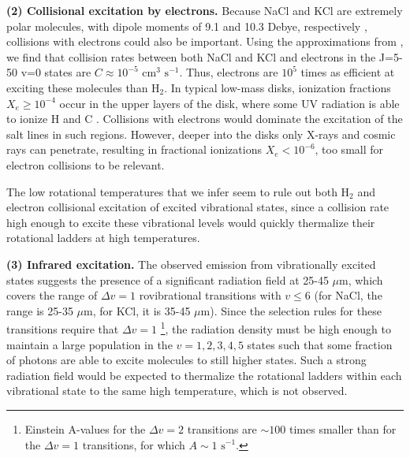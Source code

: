\documentclass[12pt]{article}
\newcommand{\hh}{\ensuremath{\textrm{H}_{2}}\xspace}			%
\newcommand{\pers}{\ensuremath{\mathrm{s}^{-1}}\xspace}
\newcommand{\um}{\ensuremath{\mu \textrm{m}}\xspace}    %
\begin{document}





\par{\textbf{(2) Collisional excitation by electrons.}} 
Because NaCl and KCl are extremely polar molecules, with dipole moments of 9.1
and 10.3 Debye, respectively \cite{Barton2014a}, collisions with electrons
could also be important.  Using the approximations from \cite{Dickinson1975a},
we find that collision rates between both NaCl and KCl and electrons in the
J=5-50 v=0 states are $C\approx10^{-5}$ cm$^{3}$ \pers.  Thus, electrons are
$10^5$ times as efficient at exciting these molecules than \hh. In typical
low-mass disks, ionization fractions $X_e \geq 10^{-4}$ occur in the upper
layers of the disk, where some UV radiation is able to ionize H and C
\cite{Bergin2007a}.  Collisions with electrons would dominate the excitation
of the salt lines in such regions.  However, deeper into the disks only X-rays
and cosmic rays can penetrate, resulting in fractional ionizations $X_e <
10^{-6}$, too small for electron collisions to be relevant. 

The low rotational temperatures that we infer seem to rule out both \hh and
electron collisional excitation of excited vibrational states, since a
collision rate high enough to excite these vibrational levels would quickly
thermalize their rotational ladders at high temperatures.


\par{\textbf{(3) Infrared excitation.}} 
The observed emission from vibrationally excited states suggests the
presence of a significant radiation field at 25-45 \um, which covers the range
of $\Delta v=1$ rovibrational transitions with $v\leq6$ (for NaCl, the range is
25-35 \um, for KCl, it is 35-45 \um).  Since the selection rules for these
transitions require that $\Delta v=1$ \footnote{Einstein A-values for the 
$\Delta v=2$ transitions are $\sim100$ times smaller than for the $\Delta v=1$
transitions, for which $A\sim1$ \pers.}, the radiation density must be high
enough to maintain a large population in the $v=1,
2, 3, 4, 5$ states such that some fraction of photons are able to excite
molecules to still higher states.  Such a strong radiation field would
be expected to thermalize the rotational ladders within each vibrational
state to the same high temperature, which is not observed.
\end{document}
